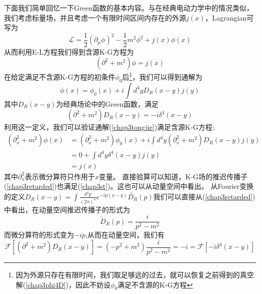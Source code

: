 下面我们简单回忆一下Green函数的基本内容。与在经典电动力学中的情况类似，我们考虑标量场，并且考虑一个有限时间区间内存在的外源$j(x)$，Lagrangian可写为
\begin{equation}
    \mathcal{L}=\frac{1}{2}(\partial_{\mu}\phi)^{2}-\frac{1}{2}m^{2}\phi^{2}+j(x)\phi(x)
\end{equation}
从而利用E-L方程我们得到含源K-G方程为
\begin{equation}
    (\partial^{2}+m^{2})\phi=j(x)
\end{equation}
在给定满足不含源K-G方程的初条件$\phi_{0}$后\footnote{因为外源只存在有限时间，我们取足够远的过去，就可以恢复之前得到的真空解(\ref{chap3phi4D})，因此不妨设$\phi_{0}$满足不含源的K-G方程}，我们可以得到通解为
\begin{equation}
\label{chap3tongjie}
    \phi(x)=\phi_{0}(x)+i\int d^{4}yD_{R}(x-y)j(y)
\end{equation}
其中$D_{R}(x-y)$为经典场论中的Green函数，满足
\begin{equation}
\label{chap3st}
    (\partial^{2}+m^{2})D_{R}(x-y)=-i\delta^{4}(x-y)
\end{equation}
利用这一定义，我们可以验证通解(\ref{chap3tongjie})满足含源K-G方程:
\begin{equation}
    \begin{aligned}
    (\partial^{2}_{x}+m^{2})\phi(x)&=(\partial^{2}_{x}+m^{2})\phi_{0}(x)+i\int d^{4}y(\partial^{2}_{x}+m^{2})D_{R}(x-y)j(y)\\
    &=0+\int d^{4}y\delta^{4}(x-y)j(y)\\
    &=j(x)
    \end{aligned}
\end{equation}
其中$\partial^{2}_{x}$表示微分算符只作用于$x$变量。
直接验算可以知道，K-G场的推迟传播子(\ref{chap3retarded})也满足(\ref{chap3st})。这也可以从动量空间中看出。
从Fourier变换的定义$D_{R}(x-y)=\int \frac{d^{4}p}{(2\pi)^{4}}e^{-ip(x-y)}\tilde{D_{R}}(p)$我们可以直接从(\ref{chap3retarded})中看出，在动量空间推迟传播子的形式为
\begin{equation}
    \widetilde{D}_{R}(p)=\frac{i}{p^{2}-m^{2}}
\end{equation}
而微分算符的形式变为$-ip$,从而在动量空间，我们有
\begin{equation}
    \mathcal{F}\left[(\partial^{2}+m^{2})D_{R}(x-y)\right]=(-p^{2}+m^{2})\frac{i}{p^{2}-m^{2}}=-i=\mathcal{F}\left[-i\delta^{4}(x-y)\right]
\end{equation}

